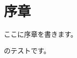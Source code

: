 \documentclass[index]{subfiles}
\begin{document}
  \chapter*{序章}
  \label{ch:prologue}

  ここに序章を書きます。

  のテストです。
\end{document}

